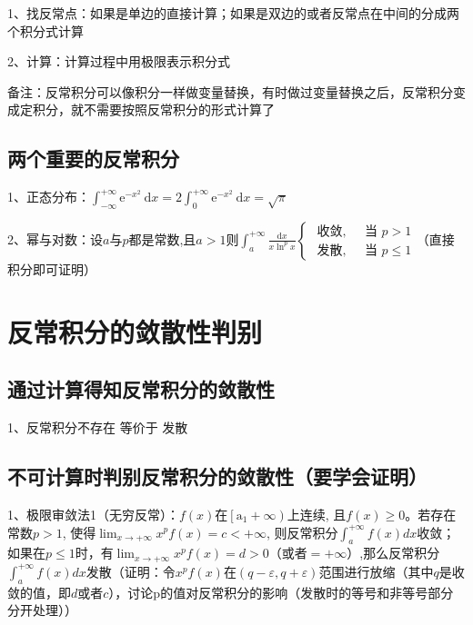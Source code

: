 1、找反常点：如果是单边的直接计算；如果是双边的或者反常点在中间的分成两个积分式计算

2、计算：计算过程中用极限表示积分式

备注：反常积分可以像积分一样做变量替换，有时做过变量替换之后，反常积分变成定积分，就不需要按照反常积分的形式计算了



\subsection{两个重要的反常积分}

1、正态分布：$\int_{-\infty}^{+\infty} \mathrm{e}^{-x^{2}} \mathrm{~d} x=2 \int_{0}^{+\infty} \mathrm{e}^{-x^{2}} \mathrm{~d} x=\sqrt{\pi}$

2、幂与对数：设$a$与$p$都是常数,且$a>1$则$\int_{a}^{+\infty} \frac{\mathrm{d} x}{x \ln ^{p} x} \begin{cases}\text { 收敛, } & \text { 当 } p>1 \\ \text { 发散, } & \text { 当 } p \leqslant 1\end{cases}$（直接积分即可证明）

\section{反常积分的敛散性判别}



\subsection{通过计算得知反常积分的敛散性}

1、反常积分不存在 等价于 发散



\subsection{不可计算时判别反常积分的敛散性（要学会证明）}

1、极限审敛法1（无穷反常）：$f(x)$在$\left[\mathrm{a}_{1}+\infty\right)$上连续, 且$f(x) \geqslant 0$。若存在常数$p>1$, 使得$ \lim_{x \rightarrow+\infty} x^{p} f(x)=c<+\infty$, 则反常积分$\int_{a}^{+\infty} f(x) d x$收敛；如果在$p \leqslant 1$时，有$\lim_{x \rightarrow+\infty} x^{p} f(x)=d>0$（或者$=+\infty$）,那么反常积分$\int_{a}^{+\infty} f({x}) dx$发散（证明：令$x^{p} f(x)$在$(q-\varepsilon,q+\varepsilon)$范围进行放缩（其中$q$是收敛的值，即$d$或者$c$），讨论p的值对反常积分的影响（发散时的等号和非等号部分分开处理））

